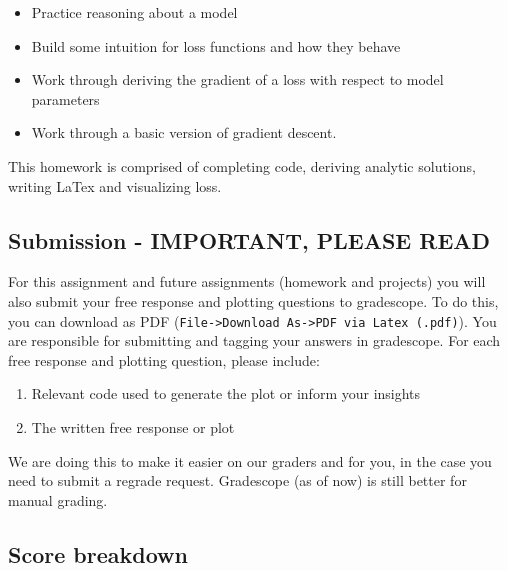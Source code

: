 \documentclass[11pt]{article}
\providecommand{\tightlist}{%
      \setlength{\itemsep}{0pt}\setlength{\parskip}{0pt}}
\begin{document}
\begin{itemize}
\item
  Practice reasoning about a model
\item
  Build some intuition for loss functions and how they behave
\item
  Work through deriving the gradient of a loss with respect to model
  parameters
\item
  Work through a basic version of gradient descent.
\end{itemize}

This homework is comprised of completing code, deriving analytic
solutions, writing LaTex and visualizing loss.

\subsection{Submission - IMPORTANT, PLEASE
READ}\label{submission---important-please-read}

For this assignment and future assignments (homework and projects) you
will also submit your free response and plotting questions to
gradescope. To do this, you can download as PDF
(\texttt{File-\textgreater{}Download\ As-\textgreater{}PDF\ via\ Latex\ (.pdf)}).
You are responsible for submitting and tagging your answers in
gradescope. For each free response and plotting question, please
include:

\begin{enumerate}
\def\labelenumi{\arabic{enumi}.}
\tightlist
\item
  Relevant code used to generate the plot or inform your insights
\item
  The written free response or plot
\end{enumerate}

We are doing this to make it easier on our graders and for you, in the
case you need to submit a regrade request. Gradescope (as of now) is
still better for manual grading.

\subsection{Score breakdown}\label{score-breakdown}
\end{document}
